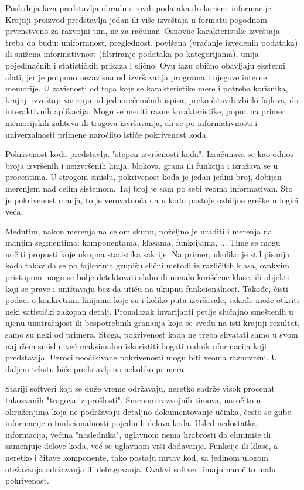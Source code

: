 \documentclass[12pt,oneside]{memoir}
\begin{document}
Poslednja faza predstavlja obradu sirovih podataka do korisne informacije. Krajnji proizvod predstavlja jedan ili više izveštaja u formatu pogodnom prvenstveno za razvojni tim, ne za računar. Osnovne karakteristike izveštaja treba da budu: uniformnost, preglednost, povišena (vraćanje izvedenih podataka) ili snižena informativnost (filtriranje podataka po kategorijama), unija pojedinačnih i statističkih prikaza i slično. Ovu fazu obično obavljaju eksterni alati, jer je potpuno nezavisna od izvršavanja programa i njegove interne memorije. U zavisnosti od toga koje se karakteristike mere i potreba korisnika, krajnji izveštaji variraju od jednorečeničnih ispisa, preko čitavih zbirki fajlova, do interaktivnih aplikacija. Mogu se meriti razne karakteristike, poput na primer memorijskih zahteva ili tragova izvršavanja, ali se po informativnosti i univerzalnosti primene naročiito ističe pokrivenost koda.


Pokrivenost koda \cite{Introduction} \cite{Testing} \cite{Ecl} \cite{Warrning} \cite{Misuse} \cite{Pizza} predstavlja "stepen izvršenosti koda". Izračunava se kao odnos broja izvršenih i neizvršenih linija, blokova, grana ili funkcija i izražava se u procentima. U strogom smislu, pokrivenost koda je jedan jedini broj, dobijen merenjem nad celim sistemom. Taj broj je sam po sebi veoma informativan. Što je pokrivenost manja, to je verovatnoća da u kodu postoje ozbiljne greške u logici veća. 


Međutim, nakon merenja na celom skupu, poželjno je uraditi i merenja na manjim segmentima: komponentama, klasama, funkcijama, ... Time se mogu uočiti propusti koje ukupna statistika sakrije. Na primer, ukoliko je stil pisanja koda takav da se po fajlovima grupišu slični metodi iz različitih klasa, ovakvim pristupom mogu se bolje detektovati slabo ili nimalo korišćene klase, ili objekti koji se prave i uništavaju bez da utiču na ukupnu funkcionalnost. Takođe, čisti podaci o konkretnim linijama koje su i koliko puta izvršavale, takođe može otkriti neki satistički zakopan detalj. Pronalazak invarijanti petlje slučajno smeštenih u njenu unutrašnjost ili bespotrebnih grananja koja se svedu na isti krajnji rezultat, samo su neki od primera. Stoga, pokrivenost koda ne treba shvatati samo u svom najužem smislu, već maksimalno iskoristiti bogati rudnik nformacija koji predstavlja. Uzroci neočikivane pokrivenosti mogu biti veoma raznovrsni. U daljem tekstu biće predstavljeno nekoliko primera. 


Stariji softveri koji se duže vreme održavaju, neretko sadrže visok procenat takozvanih "tragova iz prošlosti". Smenom razvojnih timova, naročito u okruženjima koja ne podržavaju detaljno dokumentovanje učinka, često se gube informacije o funkcionalnosti pojedinih delova koda. Usled nedostatka informacija, većina "naslednika", uglavnom nema hrabrosti da eliminiše ili zamenjuje delove koda, već se uglavnom vrši dodavanje. Funkcije ili klase, a neretko i čitave komponente, tako postaju mrtav kod, sa jedinom ulogom otežavanja održavanja ili debagovanja. Ovakvi softveri imaju naročito malu pokrivenost. 
\end{document}
